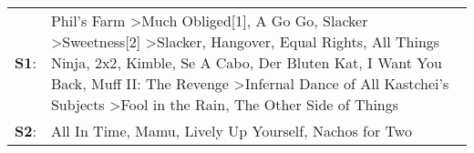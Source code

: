 \begin{supertabular}{p{0.03\textwidth}p{0.92\textwidth}}
 \textbf{S1}:  &  Phil's Farm\textsuperscript{} \textgreater \enspace Much Obliged[1]\textsuperscript{}, \enspace A Go Go\textsuperscript{}, \enspace Slacker\textsuperscript{} \textgreater \enspace Sweetness[2]\textsuperscript{} \textgreater \enspace Slacker\textsuperscript{}, \enspace Hangover\textsuperscript{}, \enspace Equal Rights\textsuperscript{}, \enspace All Things Ninja\textsuperscript{}, \enspace 2x2\textsuperscript{}, \enspace Kimble\textsuperscript{}, \enspace Se A Cabo\textsuperscript{}, \enspace Der Bluten Kat\textsuperscript{}, \enspace I Want You Back\textsuperscript{}, \enspace Muff II: The Revenge\textsuperscript{} \textgreater \enspace Infernal Dance of All Kastchei's Subjects\textsuperscript{} \textgreater \enspace Fool in the Rain\textsuperscript{}, \enspace The Other Side of Things\textsuperscript{}  \enspace  \\
 \textbf{S2}:  &                                                                                                                                                                                                                                                                                                                                                                                                                                                                                                                                                                                                                                                                                        All In Time\textsuperscript{}, \enspace Mamu\textsuperscript{}, \enspace Lively Up Yourself\textsuperscript{}, \enspace Nachos for Two\textsuperscript{}  \enspace  \\
\end{supertabular}

